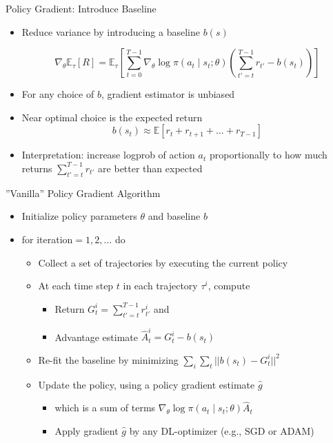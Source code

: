 \documentclass[aspectratio=169]{../latex_main/tntbeamer}  %
\begin{document}
\begin{frame}[c]{Policy Gradient: Introduce Baseline}
	
\begin{itemize}
	\item Reduce variance by introducing a baseline $b(s)$
	
	$$\nabla_\theta \mathbb{E}_\tau [R] = \mathbb{E}_\tau \left[ \sum_{t=0}^{T-1} \nabla_\theta \log \pi(a_t \mid s_t; \theta) \left( \sum_{t'=t}^{T-1} r_{t'} - b(s_t) \right) \right] $$
	
	\item For any choice of $b$, gradient estimator is unbiased
	\item Near optimal choice is the expected return
	$$b(s_t) \approx \mathbb{E} [r_t + r_{t+1} +\ldots + r_{T-1}] $$
	
	\item Interpretation: increase logprob of action $a_t$ proportionally to how much returns $\sum_{t'=t}^{T-1} r_{t'}$ are better than expected
	
\end{itemize}
	
	
\end{frame}
\begin{frame}[c]{”Vanilla” Policy Gradient Algorithm}
	
	\begin{itemize}
		\item Initialize policy parameters $\theta$ and baseline $b$
		\item for iteration$=1,2,\ldots$ do
		\begin{itemize}
			\item Collect a set of trajectories by executing the current policy
			\item At each time step $t$ in each trajectory $\tau^i$, compute
			\begin{itemize}
				\item Return $G_t^i= \sum_{t'=t}^{T-1} r_{t'}^i$ and
				\item Advantage estimate $\hat{A}^i_t = G^i_t - b(s_t)$
			\end{itemize}
			\item Re-fit the baseline by minimizing $\sum_i \sum_t || b(s_t) - G^i_t||^2$
			\item Update the policy, using a policy gradient estimate $\hat{g}$
			\begin{itemize}
				\item which is a sum of terms $\nabla_\theta \log \pi(a_t \mid s_t; \theta) \hat{A}_t$
				\item Apply gradient $\hat{g}$ by any DL-optimizer (e.g., SGD or ADAM)
			\end{itemize}
		\end{itemize}
		
	\end{itemize}
	
	
\end{frame}
\end{document}
